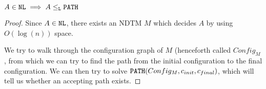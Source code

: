 \begin{theorem}
    $A \in \texttt{NL} \implies A \leq_{\texttt{L}} \texttt{PATH}$
\end{theorem}
\begin{proof}
    Since $A \in \texttt{NL}$, there exists an NDTM $M$ which decides $A$ by
    using $O(\log(n))$ space.

    We try to walk through the configuration graph of $M$ (henceforth called $Config_M$, from which
    we can try to find the path from the initial configuration to the
    final configuration. We can then try to solve
    $\texttt{PATH}(Config_M, c_{init}, c_{final})$, which will tell us
    whether an accepting path exists.
\end{proof}


